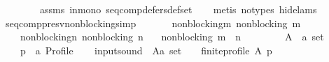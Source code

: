 \begin{isabellebody}
\ \ \ \ \ \ \ \ assms{\isacharparenleft}{\kern0pt}{}{\isacharparenright}{\kern0pt}\ in{\isacharunderscore}{\kern0pt}mono\ seq{\isacharunderscore}{\kern0pt}comp{\isacharunderscore}{\kern0pt}defers{\isacharunderscore}{\kern0pt}def{\isacharunderscore}{\kern0pt}set\isanewline
\ \ \isamarkupfalse%
\ {\isacharparenleft}{\kern0pt}metis\ {\isacharparenleft}{\kern0pt}no{\isacharunderscore}{\kern0pt}types{\isacharcomma}{\kern0pt}\ hide{\isacharunderscore}{\kern0pt}lams{\isacharparenright}{\kern0pt}{\isacharparenright}{\kern0pt}%
\endisatagproof
{\isafoldproof}%
%
\isadelimproof
%
\endisadelimproof
%
\isadelimdocument
%
\endisadelimdocument
%
\isatagdocument
%
\isamarkuptrue%
%
\endisatagdocument
{\isafolddocument}%
%
\isadelimdocument
%
\endisadelimdocument
{}\isamarkupfalse%
\ seq{\isacharunderscore}{\kern0pt}comp{\isacharunderscore}{\kern0pt}presv{\isacharunderscore}{\kern0pt}non{\isacharunderscore}{\kern0pt}blocking{\isacharbrackleft}{\kern0pt}simp{\isacharbrackright}{\kern0pt}{\isacharcolon}{\kern0pt}\isanewline
\ \ \isanewline
\ \ \ \ non{\isacharunderscore}{\kern0pt}blocking{\isacharunderscore}{\kern0pt}m{\isacharcolon}{\kern0pt}\ {\isachardoublequoteopen}non{\isacharunderscore}{\kern0pt}blocking\ m{\isachardoublequoteclose}\ \isanewline
\ \ \ \ non{\isacharunderscore}{\kern0pt}blocking{\isacharunderscore}{\kern0pt}n{\isacharcolon}{\kern0pt}\ {\isachardoublequoteopen}non{\isacharunderscore}{\kern0pt}blocking\ n{\isachardoublequoteclose}\isanewline
\ \ \ {\isachardoublequoteopen}non{\isacharunderscore}{\kern0pt}blocking\ {\isacharparenleft}{\kern0pt}m\ {\isasymtriangleright}\ n{\isacharparenright}{\kern0pt}{\isachardoublequoteclose}\isanewline
%
\isadelimproof
%
\endisadelimproof
%
\isatagproof
{}\isamarkupfalse%
\ {\isacharminus}{\kern0pt}\isanewline
\ \ \isamarkupfalse%
\isanewline
\ \ \ \ A\ {\isacharcolon}{\kern0pt}{\isacharcolon}{\kern0pt}\ {\isachardoublequoteopen}{\isacharprime}{\kern0pt}a\ set{\isachardoublequoteclose}\ \isanewline
\ \ \ \ p\ {\isacharcolon}{\kern0pt}{\isacharcolon}{\kern0pt}\ {\isachardoublequoteopen}{\isacharprime}{\kern0pt}a\ Profile{\isachardoublequoteclose}\isanewline
\ \ \isamarkupfalse%
\ {\isacharquery}{\kern0pt}input{\isacharunderscore}{\kern0pt}sound\ {\isacharequal}{\kern0pt}\ {\isachardoublequoteopen}{\isacharparenleft}{\kern0pt}{\isacharparenleft}{\kern0pt}A{\isacharcolon}{\kern0pt}{\isacharcolon}{\kern0pt}{\isacharprime}{\kern0pt}a\ set{\isacharparenright}{\kern0pt}\ {\isasymnoteq}\ {\isacharbraceleft}{\kern0pt}{\isacharbraceright}{\kern0pt}\ {\isasymand}\ finite{\isacharunderscore}{\kern0pt}profile\ A\ p{\isacharparenright}{\kern0pt}{\isachardoublequoteclose}\isanewline

\end{isabellebody}
